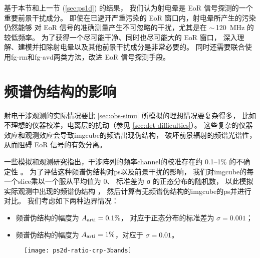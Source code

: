 基于本节和上一节 (\autoref{sec:ps1d}) 的结果，
我们认为射电晕是 EoR 信号探测的一个重要前景干扰成分。
即使在已避开严重污染的 EoR 窗口内，射电晕所产生的污染仍然能够
对 EoR 信号的准确测量产生不可忽略的干扰，尤其是在 $\sim$\,\SI{120}{\MHz} 的较低频率。
为了获得一个尽可能干净、同时也尽可能大的 EoR 窗口，
深入理解、建模并扣除射电晕以及其他前景干扰成分是非常必要的。
同时还需要联合使用\ac{fg-rm}和\ac{fg-avd}两类方法，改进 EoR 信号探测手段。


\section{频谱伪结构的影响}
\label{sec:freq-artifacts}

射电干涉观测的实际情况要比 \autoref{sec:obs-simu} 所模拟的理想情况要复杂得多，
比如不理想的仪器校准，电离层的扰动（参见 \autoref{sec:det-difficulties}）。
这些复杂的仪器效应和观测效应会导致\ac{imgcube}的频谱出现伪结构，
破坏前景辐射的频谱光谱性，从而阻碍 EoR 信号的有效分离。

一些模拟和观测研究指出，干涉阵列的频率\ac{channel}的校准存在约
\numrange{0.1}{1}\% 的不确定性
\cite{barry2016,beardsley2016,ewallWice2017}。
为了评估这种频谱伪结构对\ac{ps}以及前景干扰的影响，
我们对\ac{imgcube}的每一个\ac{slice}乘以一个服从平均值为 0、
标准差为 σ 的正态分布的随机数，
以此模拟实际观测中出现的频谱伪结构 \cite{chapman2016}，
然后计算有无频谱伪结构的\ac{imgcube}的\ac{ps}并进行对比。
我们考虑如下两种边界情况：
\begin{itemize}
  \item 频谱伪结构的幅度为 $A_{\mathrm{arti}} = 0.1\%$，
    对应于正态分布的标准差为 $σ = 0.001$；
  \item 频谱伪结构的幅度为 $A_{\mathrm{arti}} = 1\%$，对应于 $σ = 0.01$。
\end{itemize}

\begin{figure}[htp]
  \centering
  \texttt{[image: ps2d-ratio-crp-3bands]}
  \label{fig:ps2d-ratio-crp}
\end{figure}


